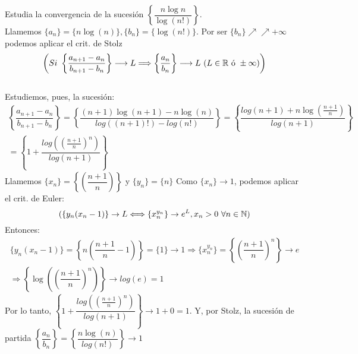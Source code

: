 \documentclass[12pt]{article}
\begin{document}
    \begin{ejercicio} Estudia la convergencia de la sucesión $\left\{\dfrac{n \log{n}}{\log(n!)}\right\}$. \\

        \noindent 
        Llamemos $\{a_n\} = \{n \log(n)\}, \{b_n\} = \{\log(n!)\}$. Por ser $\{b_n\} \nearrow\nearrow +\infty$ podemos aplicar el crit. de Stolz \\
        \begin{equation*}
            \left(Si \  \left\{\dfrac{a_{n+1} - a_n}{b_{n+1} - b_n}\right\} \longrightarrow L \Longrightarrow \left\{\dfrac{a_n}{b_n}\right\} \longrightarrow L \ (L \in {\mathbb{R}} \text{ ó } \pm \infty) \right)
        \end{equation*} \\
        Estudiemos, pues, la sucesión:
        \begin{gather*}
            \left\{\dfrac{a_{n+1} - a_n}{b_{n+1} - b_n}\right\} = \left\{\dfrac{(n+1)\log(n + 1) - n \log(n)}{log((n + 1)!) - log(n!)}\right\} = \left\{\dfrac{log(n+1) + n \log\left(\frac{n+1}{n}\right)}{log(n+1)}\right\} \\ =  \left\{1 + \dfrac{log((\frac{n+1}{n})^n)}{log(n+1)}\right\}
        \end{gather*}
        Llamemos $\{x_n\} = \left\{\left(\dfrac{n+ 1}{n}\right)\right\}$ y $\{y_n\} = \{n\}$
        Como $\{x_n\} \rightarrow 1$, podemos aplicar el crit. de Euler:
        \begin{equation*}
        (\{y_n(x_n-1)\} \rightarrow L \Longleftrightarrow \{x_n^{y_n} \} \rightarrow e^L, x_n > 0  \ \forall n \in {\mathbb{N}})
        \end{equation*}
        Entonces:
        \begin{gather*}
            \{y_n(x_n - 1)\} = \left\{n\left(\dfrac{n + 1}{n} - 1\right) \right\} = \{1\}  \rightarrow 1 \Rightarrow \{x_n^{y_n}\} = \left\{\left(\dfrac{n+1}{n}\right)^n\right\} \rightarrow e \\
            \Rightarrow \left\{\log\left(\left(\dfrac{n+1}{n}\right)^n\right)\right\} \rightarrow log(e) = 1
        \end{gather*}
        Por lo tanto, $\left\{1 + \dfrac{log((\frac{n+1}{n})^n)}{log(n+1)}\right\} \rightarrow 1 + 0 = 1$. Y, por Stolz, la sucesión de partida $\boxed{\left\{\dfrac{a_n}{b_n}\right\} = \left\{\dfrac{n\log(n)}{log(n!)}\right\} \rightarrow 1}$
    \end{ejercicio}
    
\end{document}
